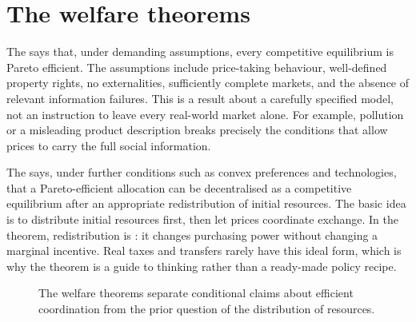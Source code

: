 \section{The welfare theorems}

The  says that, under demanding assumptions,
every competitive equilibrium is Pareto efficient. The assumptions include
price-taking behaviour, well-defined property rights, no externalities,
sufficiently complete markets, and the absence of relevant information
failures. This is a result about a carefully specified model, not an
instruction to leave every real-world market alone. For example, pollution or
a misleading product description breaks precisely the conditions that allow
prices to carry the full social information.

The  says, under further conditions such as
convex preferences and technologies, that a Pareto-efficient allocation can
be decentralised as a competitive equilibrium after an appropriate
redistribution of initial resources. The basic idea is to distribute initial
resources first, then let prices coordinate exchange. In the theorem,
redistribution is : it changes purchasing power without
changing a marginal incentive. Real taxes and transfers rarely have this ideal
form, which is why the theorem is a guide to thinking rather than a ready-made
policy recipe.

\begin{figure}[htbp]
  \centering
  \caption{The welfare theorems separate conditional claims about efficient
  coordination from the prior question of the distribution of resources.}
  \label{fig:welfare-theorems}
\end{figure}
\FloatBarrier

